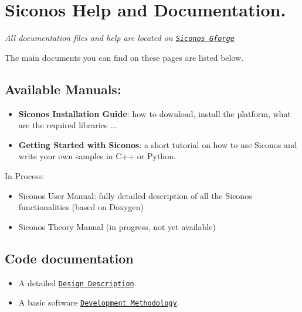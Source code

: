 \hypertarget{SiconosDocList}{}\section{Siconos Help and Documentation.}\label{SiconosDocList}
{\em  All documentation files and help are located on \href{https://gforge.inria.fr/projects/siconos/}{\tt Siconos Gforge}\par
 The main documents you can find on these pages are listed below. \/}\hypertarget{SiconosDocList_manuals}{}\subsection{Available Manuals:}\label{SiconosDocList_manuals}
\begin{itemize}
\item {\bf Siconos Installation Guide}: how to download, install the platform, what are the required libraries ...\end{itemize}


\begin{itemize}
\item {\bf Getting Started with Siconos}: a short tutorial on how to use Siconos and write your own samples in C++ or Python.\end{itemize}


In Process:

\begin{itemize}
\item Siconos User Manual: fully detailed description of all the Siconos functionalities (based on Doxygen)\end{itemize}


\begin{itemize}
\item Siconos Theory Manual (in progress, not yet available)\end{itemize}
\hypertarget{SiconosDocList_docCode}{}\subsection{Code documentation}\label{SiconosDocList_docCode}
\begin{itemize}
\item A detailed \href{http://siconos.gforge.inria.fr/docDev/design.html}{\tt Design Description}.\end{itemize}


\begin{itemize}
\item A basic software \href{http://siconos.gforge.inria.fr/docDev/sdm.html}{\tt Development Methodology}.\end{itemize}


